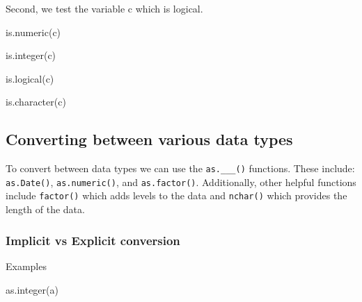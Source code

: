 \documentclass[
  letterpaper,
  DIV=11,
  numbers=noendperiod]{scrreprt}
\newenvironment{Shaded}{}{}
\newcommand{\FunctionTok}[1]{\textcolor[rgb]{0.44,0.26,0.76}{#1}}
\newcommand{\NormalTok}[1]{\textcolor[rgb]{0.14,0.16,0.18}{#1}}
\begin{document}
Second, we test the variable c which is logical.

\begin{Shaded}
\begin{Highlighting}[]
\FunctionTok{is.numeric}\NormalTok{(c)}
\end{Highlighting}
\end{Shaded}

\begin{Shaded}
\begin{Highlighting}[]
\FunctionTok{is.integer}\NormalTok{(c)}
\end{Highlighting}
\end{Shaded}

\begin{Shaded}
\begin{Highlighting}[]
\FunctionTok{is.logical}\NormalTok{(c)}
\end{Highlighting}
\end{Shaded}

\begin{Shaded}
\begin{Highlighting}[]
\FunctionTok{is.character}\NormalTok{(c)}
\end{Highlighting}
\end{Shaded}

\subsection{Converting between various data
types}\label{converting-between-various-data-types}

To convert between data types we can use the \texttt{as.\_\_\_()}
functions. These include: \texttt{as.Date()}, \texttt{as.numeric()}, and
\texttt{as.factor()}. Additionally, other helpful functions include
\texttt{factor()} which adds levels to the data and \texttt{nchar()}
which provides the length of the data.

\subsubsection{Implicit vs Explicit
conversion}\label{implicit-vs-explicit-conversion}

Examples

\begin{Shaded}
\begin{Highlighting}[]
\FunctionTok{as.integer}\NormalTok{(a)}
\end{Highlighting}
\end{Shaded}
\end{document}
